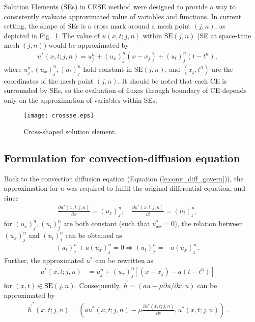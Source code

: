 \documentclass[11pt,dvips]{article}
\renewcommand{\figurename}{Fig.}
\numberwithin{equation}{section}
\begin{document}
Solution Elements (SEs) in CESE method were designed to provide a way to
consistently evaluate approximated value of variables and functions.  In
current setting, the shape of SEs is a cross mark around a mesh point $(j,n)$,
as depicted in \figurename~\ref{f:crossse}.  The value of $u(x,t;j,n)$ within
$\mathrm{SE}(j,n)$ (SE at space-time mesh $(j,n)$) would be approximated by
\begin{align*}
  u^*(x,t;j,n) = u_j^n + (u_x)_j^n(x-x_j) + (u_t)_j^n(t-t^n),
\end{align*}
where $u_j^n, (u_x)_j^n, (u_t)_j^n$ hold constant in $\mathrm{SE}(j,n)$, and
$(x_j,t^n)$ are the coordinates of the mesh point $(j,n)$.  It should be noted
that each CE is surrounded by SEs, so the evaluation of fluxes through boundary
of CE depends only on the approximation of variables within SEs.

\begin{figure}[hbtp]
  \centering
  \texttt{[image: crossse.eps]}
  \caption{Cross-shaped solution element.}
  \label{f:crossse}
\end{figure}

\subsection{Formulation for convection-diffusion equation}

Back to the convection diffusion eqation (Equation (\ref{e:conv_diff_govern})),
the approximation for $u$ was required to fulfill the original differential
equation, and since
\begin{align*}
  \frac{\partial u^*(x,t;j,n)}{\partial x} = (u_x)_j^n, \quad
  \frac{\partial u^*(x,t;j,n)}{\partial t} = (u_t)_j^n,
\end{align*}
for $(u_x)_j^n, (u_t)_j^n$ are both constant (such that $u^*_{xx}=0$), the
relation between $(u_x)_j^n$ and $(u_t)_j^n$ can be obtained as
\begin{align*}
              (u_t)_j^n + a(u_x)_j^n = 0
  \Rightarrow (u_t)_j^n = -a(u_x)_j^n\,.
\end{align*}
Further, the approximated $u^*$ can be rewritten as
\begin{align*}
  u^*(x,t;j,n) &= u_j^n + (u_x)_j^n[(x-x_j) - a(t-t^n)]
\end{align*}
for $(x,t)\in\mathrm{SE}(j,n)$.  Consequently, $\vec{h}=(au-\mu\partial
u/\partial x, u)$ can be approximated by
\begin{align*}
  \vec{h}^*(x,t;j,n) =
  \left(
    au^*(x,t;j,n)-\mu\frac{\partial u^*(x,t;j,n)}{\partial x}, u^*(x,t;j,n)
  \right)\,.
\end{align*}
\end{document}
